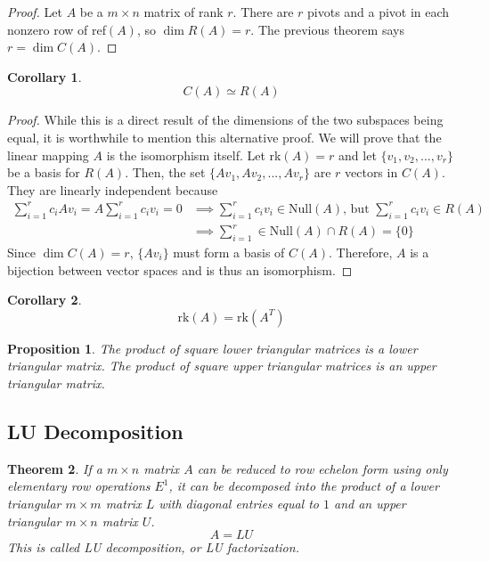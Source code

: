 \documentclass{article}
\newtheorem{theorem}{Theorem}[section]
\newtheorem{proposition}[theorem]{Proposition}
\newtheorem{corollary}{Corollary}[theorem]
\theoremstyle{remark}
\theoremstyle{definition}
\begin{document}
    \begin{proof}
    Let $A$ be a $m \times n$ matrix of rank $r$. There are $r$ pivots and a pivot in each nonzero row of ref$(A)$, so $\dim R(A) = r$. The previous theorem says $r = \dim C(A)$. 
    \end{proof}

    \begin{corollary}
    \[C(A) \simeq R(A)\]
    \end{corollary}

    \begin{proof}
    While this is a direct result of the dimensions of the two subspaces being equal, it is worthwhile to mention this alternative proof. We will prove that the linear mapping $A$ is the isomorphism itself. Let rk$(A) = r$ and let $\{ v_1, v_2, ..., v_r\}$ be a basis for $R(A)$. Then, the set $\{ A v_1, A v_2, ..., A v_r\}$ are $r$ vectors in $C(A)$. They are linearly independent because 
    \begin{align*}
        \sum_{i = 1}^r c_i A v_i = A \sum_{i=1}^r c_i v_i = 0 & \implies \sum_{i=1}^r c_i v_i \in \text{Null}(A) \text{, but } \sum_{i=1}^r c_i v_i \in R(A) \\
        & \implies \sum_{i=1}^r \in \text{Null}(A) \cap R(A) = \{0\}
    \end{align*} 
    Since $\dim C(A) = r$, $\{A v_i\}$ must form a basis of $C(A)$. Therefore, $A$ is a bijection between vector spaces and is thus an isomorphism. 
    \end{proof}

    \begin{corollary}
    \[\text{rk}(A) = \text{rk}(A^T)\]
    \end{corollary}

    \begin{proposition}
    The product of square lower triangular matrices is a lower triangular matrix. The product of square upper triangular matrices is an upper triangular matrix. 
    \end{proposition}

  \subsection{LU Decomposition}

    \begin{theorem}
    If a $m \times n$ matrix $A$ can be reduced to row echelon form using only elementary row operations $E^1$, it can be decomposed into the product of a lower triangular $m \times m$ matrix $L$ with diagonal entries equal to $1$ and an upper triangular $m \times n$ matrix $U$. 
    \[A = L U\]
    This is called \textit{LU decomposition}, or \textit{LU factorization}. 
    \end{theorem}
\end{document}
